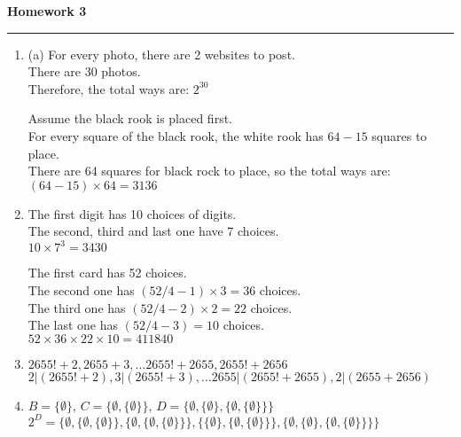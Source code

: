 \documentclass[12pt]{article}
\begin{document}
\begin{center}
\textbf{\Large Homework 3}\\
\end{center}
\hrule

\vspace{0.2cm}
\begin{enumerate}
\item
{}(a) For every photo, there are 2 websites to post.\\
There are 30 photos.\\
Therefore, the total ways are: $2^{30}$
\vspace{.15in}

 Assume the black rook is placed first.\\
For every square of the black rook, the white rook has $64-15$ squares to place.\\
There are 64 squares for black rock to place, so the total ways are:\\
$(64-15) \times 64=3136$
\vspace{.15in}

\item
{} The first digit has 10 choices of digits.\\
The second, third and last one have 7 choices.\\
$10 \times 7^{3}=3430$
\vspace{.15in}

 The first card has 52 choices. \\
The second one has $(52/4-1) \times 3 = 36$ choices.\\
The third one has $(52/4-2) \times 2 = 22$ choices.\\
The last one has $(52/4-3) = 10$ choices.\\
$52 \times 36 \times 22 \times 10=411840$
\vspace{.15in}

\item 
\noindent $2655!+2, 2655+3,  \dots 2655!+2655,2655!+2656$\\
$2|(2655!+2), 3|(2655!+3), \dots 2655|(2655!+2655), 2|(2655+2656)$\\



\item
$B=\{\emptyset\}$, $C=\{\emptyset,\{\emptyset\}\}$, $D=\{\emptyset,\{\emptyset\},\{\emptyset,\{\emptyset\}\}\}$\\
$2^{D}=\{\emptyset,
\{\emptyset,\{\emptyset\}\},
\{\emptyset,\{\emptyset,\{\emptyset\}\}\},
\{\{\emptyset\},\{\emptyset,\{\emptyset\}\}\},
\{\emptyset,\{\emptyset\},\{\emptyset,\{\emptyset\}\}\}\}$


\end{enumerate}
\end{document}
